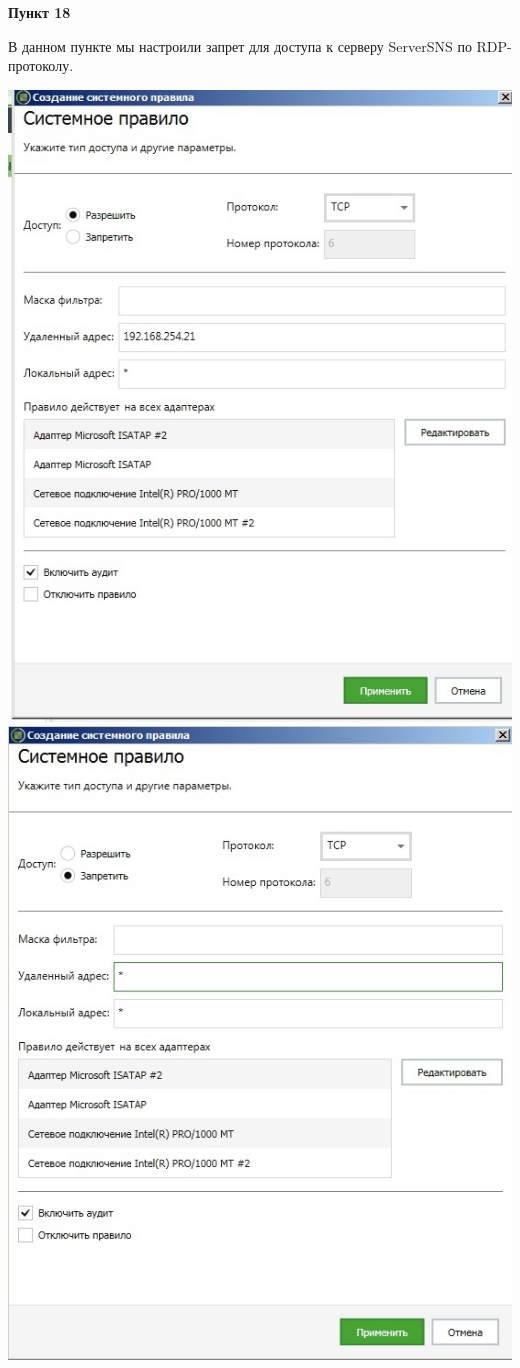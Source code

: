 \documentclass[a4paper,14pt]{extarticle}
\begin{document}
    \textbf{Пункт 18}
    \begin{center}
        В данном пункте мы настроили запрет для доступа к серверу ServerSNS по RDP-протоколу.
        \begin{multicols}{2}
            \includegraphics[scale=0.4]{pics/18_1.jpg}
            \includegraphics[scale=0.4]{pics/18_2.jpg}

\end{multicols}
\end{center}
\end{document}
